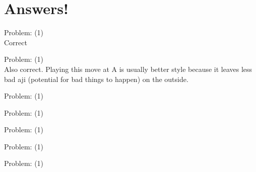 \documentclass[11pt]{article}
\begin{document}
\part{Answers!}
\begin{minipage}[t]{0.5\textwidth}
  {\centering
  
Problem: (1)\\
Correct\\
  }
\end{minipage}
\begin{minipage}[t]{0.5\textwidth}
  {\centering
  
Problem: (1)\\
Also correct. Playing this move at A is usually better style because it leaves less bad aji (potential for bad things to happen) on the outside.\\
  }
\end{minipage}
\begin{minipage}[t]{0.5\textwidth}
  {\centering
  
Problem: (1)\\
  }
\end{minipage}
\begin{minipage}[t]{0.5\textwidth}
  {\centering
  
Problem: (1)\\
  }
\end{minipage}
\begin{minipage}[t]{0.5\textwidth}
  {\centering
  
Problem: (1)\\
  }
\end{minipage}
\begin{minipage}[t]{0.5\textwidth}
  {\centering
  
Problem: (1)\\
  }
\end{minipage}
\begin{minipage}[t]{0.5\textwidth}
  {\centering
  
Problem: (1)\\
  }
\end{minipage}
\end{document}
